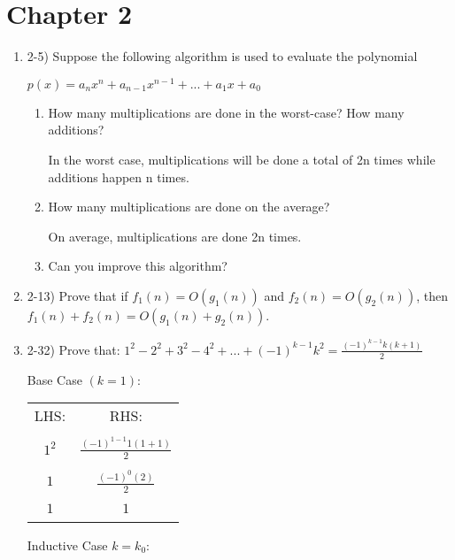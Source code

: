 \documentclass{article}
\begin{document}
\section{Chapter 2}
\begin{enumerate}
    \item 2-5) Suppose the following algorithm is used to evaluate the polynomial
    
    \(p(x)=a_nx^n+a_{n-1}x^{n-1}+...+a_1x+a_0\)
    
    \begin{center}
    \end{center}
    \begin{enumerate}
        \item How many multiplications are done in the worst-case? How many additions?

        In the worst case, multiplications will be done a total of 2n times while additions happen n times.

        \item How many multiplications are done on the average?

        On average, multiplications are done 2n times.
        
        \item Can you improve this algorithm?

        
        
    \end{enumerate}
    \item 2-13) Prove that if $f_1(n) =O(g_1(n))$ and $f_2(n)=O(g_2(n))$, then $f_1(n)+f_2(n)=O(g_1(n)+g_2(n))$.

    

    \item 2-32) Prove that: 
    \(1^2-2^2+3^2-4^2+...+(-1)^{k-1}k^2=\frac{(-1)^{k-1}k(k+1)}{2}\)

    Base Case $(k=1)$:
    \begin{center}
        \begin{tabular}{ c | c } 
        LHS: & RHS: \\ & \\
        $ 1^2 $ & $ \frac{(-1)^{1-1}1(1+1)}{2} $ \\ \\
        $ 1 $ & $ \frac{(-1)^{0}(2)}{2} $ \\ \\
        $ 1 $ & $ 1 $ \\ \\
        \end{tabular}
    \end{center}
    Inductive Case $ k = k_0 $:
    

\end{enumerate}
\end{document}
